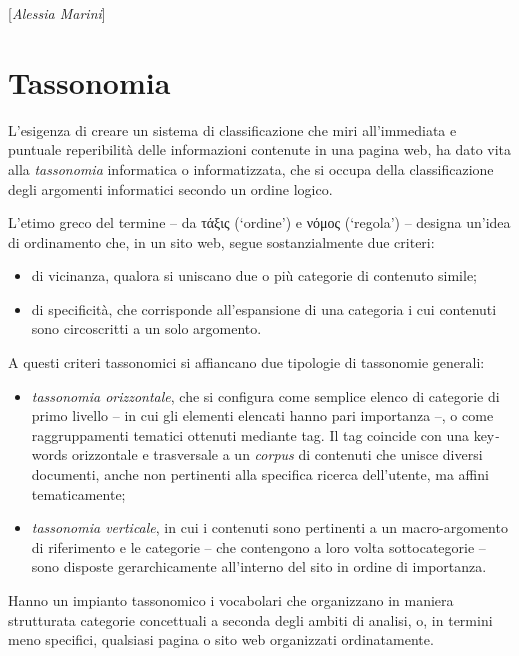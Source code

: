 \hrulefill 
 
{[}\emph{Alessia Marini}{]}



\chapter{Tassonomia}

L'esigenza di creare un sistema di classificazione che miri
all'immediata e puntuale reperibilità delle informazioni contenute in
una pagina web, ha dato vita alla \emph{tassonomia} informatica o
informatizzata, che si occupa della classificazione degli argomenti
informatici secondo un ordine logico.

L'etimo greco del termine -- da τάξις (`ordine') e νόμος (`regola') --
designa un'idea di ordinamento che, in un sito web, segue
sostanzialmente due criteri:

\begin{itemize}
\item
  di vicinanza, qualora si uniscano due o più categorie di contenuto
  simile;
\item
  di specificità, che corrisponde all'espansione di una categoria i cui
  contenuti sono circoscritti a un solo argomento.
\end{itemize}

A questi criteri tassonomici si affiancano due tipologie di tassonomie
generali:

\begin{itemize}
\item
  \emph{tassonomia orizzontale}, che si configura come semplice elenco
  di categorie di primo livello -- in cui gli elementi elencati hanno
  pari importanza --, o come raggruppamenti tematici ottenuti mediante
  tag. Il tag coincide con una key\emph{-}words orizzontale e
  trasversale a un \emph{corpus} di contenuti che unisce diversi
  documenti, anche non pertinenti alla specifica ricerca dell'utente, ma
  affini tematicamente;
\item
  \emph{tassonomia verticale}, in cui i contenuti sono pertinenti a un
  macro-argomento di riferimento e le categorie -- che contengono a loro
  volta sottocategorie -- sono disposte gerarchicamente all'interno del
  sito in ordine di importanza.
\end{itemize}

Hanno un impianto tassonomico i vocabolari che organizzano in maniera
strutturata categorie concettuali a seconda degli ambiti di analisi, o,
in termini meno specifici, qualsiasi pagina o sito web organizzati
ordinatamente.

